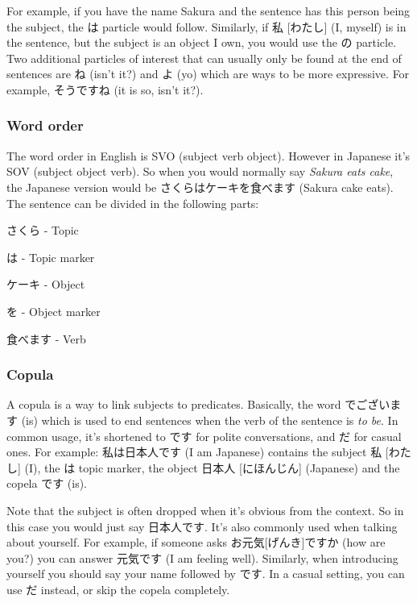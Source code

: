 \documentclass{article}
\begin{document}
\begin{CJK}{UTF8}{min}
\begin{multicols*}{3}
For example, if you have the name Sakura and the sentence has this person being the subject, the は particle would follow. Similarly, if 私 [わたし] (I, myself) is in the sentence, 
but the subject is an object I own, you would use the の particle. Two additional particles of interest that can usually only be found at the end of sentences are ね (isn't it?) and 
よ (yo) which are ways to be more expressive. For example, そうですね (it is so, isn't it?).

\subsubsection{Word order}

The word order in English is SVO (subject verb object). However in Japanese it's SOV (subject object verb). So when you would normally say \textit{Sakura eats cake}, the Japanese 
version would be さくらはケーキを食べます (Sakura cake eats). The sentence can be divided in the following parts:

\begin{colorize}
\item さくら - Topic
\item は - Topic marker
\item ケーキ - Object
\item を - Object marker
\item 食べます - Verb
\end{colorize}

\subsubsection{Copula}

A copula is a way to link subjects to predicates. Basically, the word でございます (is) which is used to end sentences when the verb of the sentence is \textit{to be}. In common usage, 
it's shortened to です for polite conversations, and だ for casual ones. For example: 私は日本人です (I am Japanese) contains the subject 私 [わたし] (I), the は topic marker, the 
object 日本人 [にほんじん] (Japanese) and the copela です (is).

Note that the subject is often dropped when it's obvious from the context. So in this case you would just say 日本人です. It's also commonly used when talking about yourself. For 
example, if someone asks お元気[げんき]ですか (how are you?) you can answer 元気です (I am feeling well). Similarly, when introducing yourself you should say your name followed by 
です. In a casual setting, you can use だ instead, or skip the copela completely.


\end{multicols*}
\end{CJK}
\end{document}
